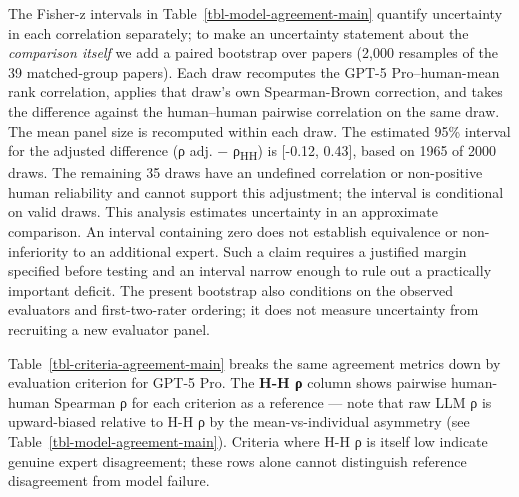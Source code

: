 \documentclass[
  11pt,
  letterpaper,
]{article}
\begin{document}
The Fisher-z intervals in Table~\ref{tbl-model-agreement-main} quantify
uncertainty in each correlation separately; to make an uncertainty
statement about the \emph{comparison itself} we add a paired bootstrap
over papers (2,000 resamples of the 39 matched-group papers). Each draw
recomputes the GPT-5 Pro--human-mean rank correlation, applies that
draw's own Spearman-Brown correction, and takes the difference against
the human--human pairwise correlation on the same draw. The mean panel
size is recomputed within each draw. The estimated 95\% interval for the
adjusted difference (ρ adj. − ρ\textsubscript{HH}) is {[}-0.12, 0.43{]},
based on 1965 of 2000 draws. The remaining 35 draws have an undefined
correlation or non-positive human reliability and cannot support this
adjustment; the interval is conditional on valid draws. This analysis
estimates uncertainty in an approximate comparison. An interval
containing zero does not establish equivalence or non-inferiority to an
additional expert. Such a claim requires a justified margin specified
before testing and an interval narrow enough to rule out a practically
important deficit. The present bootstrap also conditions on the observed
evaluators and first-two-rater ordering; it does not measure uncertainty
from recruiting a new evaluator panel.

Table~\ref{tbl-criteria-agreement-main} breaks the same agreement
metrics down by evaluation criterion for GPT-5 Pro. The \textbf{H-H ρ}
column shows pairwise human-human Spearman ρ for each criterion as a
reference --- note that raw LLM ρ is upward-biased relative to H-H ρ by
the mean-vs-individual asymmetry (see
Table~\ref{tbl-model-agreement-main}). Criteria where H-H ρ is itself
low indicate genuine expert disagreement; these rows alone cannot
distinguish reference disagreement from model failure.
\end{document}
